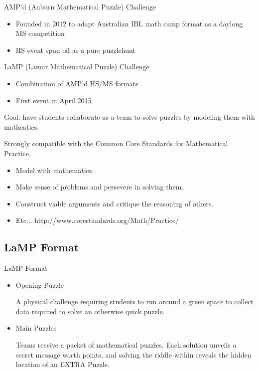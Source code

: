 \documentclass{beamer}
\theoremstyle{theorem}
\theoremstyle{definition}
\newcommand{\<}{\langle}
\renewcommand{\>}{\rangle}
\newcommand{\vpause}{\pause\vspace{1em}}
\begin{document}
\begin{frame}
  AMP'd (Auburn Mathematical Puzzle) Challenge
  \begin{itemize}
    \item Founded in 2012 to adapt Australian IBL math camp format
          as a daylong MS competition
    \item HS event spun off as a pure puzzlehunt
  \end{itemize}

  \vpause
  LaMP (Lamar Mathematical Puzzle) Challenge
  \begin{itemize}
    \item Combination of AMP'd HS/MS formats
    \item First event in April 2015
  \end{itemize}

  \vpause

  Goal: have students collaborate as a team to solve puzzles by modeling them
  with matheatics.
\end{frame}

\begin{frame}
  Strongly compatible with the Common Core Standards for Mathematical
  Practice.

  \pause

  \begin{itemize}
    \item Model with mathematics.
    \pause
    \item Make sense of problems and persevere in solving them.
    \pause
    \item Construct viable arguments and critique the reasoning of others.
    \pause
    \item Etc...
          http://www.corestandards.org/Math/Practice/
  \end{itemize}
\end{frame}

\subsection{LaMP Format}

\begin{frame}{LaMP Format}

  \begin{itemize}
    \item
    Opening Puzzle

    A physical challenge requiring students to run around a green space
    to collect data required to solve an otherwise quick puzzle.

    \vpause

    \item
    Main Puzzles

    Teams receive a packet of mathematical puzzles. Each solution unveils
    a secret message worth points, and solving the riddle within reveals
    the hidden location of an EXTRA Puzzle.

  \end{itemize}
\end{frame}
\end{document}

